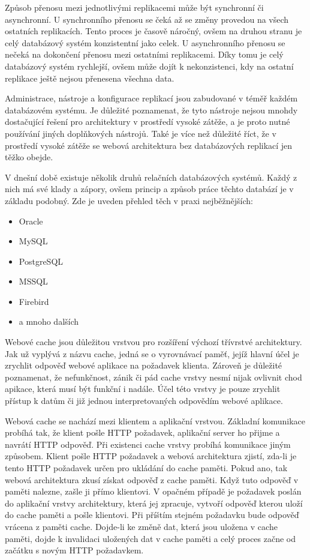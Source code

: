 \documentclass[12pt]{article}
\begin{document}
Způsob přenosu mezi jednotlivými replikacemi může být synchronní či asynchronní. U synchronního přenosu se čeká až se změny provedou na všech ostatních replikacích. Tento proces je časově náročný, ovšem na druhou stranu je celý databázový systém konzistentní jako celek. U asynchronního přenosu se nečeká na dokončení přenosu mezi ostatními replikacemi. Díky tomu je celý databázový systém rychlejší, ovšem může dojít k nekonzistenci, kdy na ostatní replikace ještě nejsou přenesena všechna data.

Administrace, nástroje a konfigurace replikací jsou zabudované v téměř každém databázovém systému. Je důležité poznamenat, že tyto nástroje nejsou mnohdy dostačující řešení pro architektury v prostředí vysoké zátěže, a je proto nutné používání jiných doplňkových nástrojů. Také je více než důležité říct, že v prostředí vysoké zátěže se webová architektura bez databázových replikací jen těžko obejde.\cite{replikace}

V dnešní době existuje několik druhů relačních databázových systémů. Každý z nich má své klady a zápory, ovšem princip a způsob práce těchto databází je v základu podobný. Zde je uveden přehled těch v praxi nejběžnějších:

\begin{itemize}
\item Oracle
\item MySQL
\item PostgreSQL
\item MSSQL
\item Firebird
\item a mnoho dalších
\end{itemize}



Webové cache jsou důležitou vrstvou pro rozšíření výchozí třívrstvé architektury. Jak už vyplývá z názvu cache, jedná se o vyrovnávací paměť, jejíž hlavní účel je zrychlit odpověď webové aplikace na požadavek klienta. Zároveň je důležité poznamenat, že nefunkčnost, zánik či pád cache vrstvy nesmí nijak ovlivnit chod apikace, která musí být funkční i nadále. Účel této vrstvy je pouze zrychlit přístup k datům či již jednou interpretovaných odpovědím webové aplikace.

Webová cache se nachází mezi klientem a aplikační vrstvou. Základní komunikace probíhá tak, že klient pošle HTTP požadavek, aplikační server ho přijme a navrátí HTTP odpověď. Při existenci cache vrstvy probíhá komunikace jiným způsobem. Klient pošle HTTP požadavek a webová architektura zjistí, zda-li je tento HTTP požadavek určen pro ukládání do cache paměti. Pokud ano, tak webová architektura zkusí získat odpověď z cache paměti. Když tuto odpověď v paměti nalezne, zašle ji přímo klientovi. V opačném případě je požadavek poslán do aplikační vrstvy architektury, která jej zpracuje, vytvoří odpověď kterou uloží do cache paměti a pošle klientovi. Při příštím stejném požadavku bude odpověď vrácena z paměti cache. Dojde-li ke změně dat, která jsou uložena v cache paměti, dojde k invalidaci uložených dat v cache paměti a celý proces začne od začátku s novým HTTP požadavkem.
\end{document}
